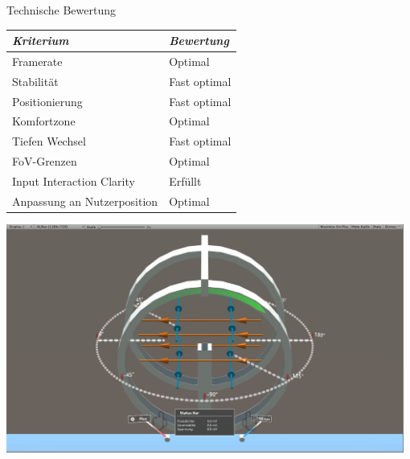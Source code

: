 \begin{frame}[fragile]{Technische Bewertung}
\begin{minipage}{0.62\textwidth}
\bgroup
\setlength\extrarowheight{1pt}
\def\arraystretch{1.1}
\begin{table}
	\centering
	\begin{tabular}{m{4.1cm}|l}
		\textit{Kriterium} & \textit{Bewertung}\\
		\hline
		Framerate & Optimal\\
		\hline
		Stabilität & Fast optimal\\
		\hline
		Positionierung & Fast optimal\\
		\hline
		Komfortzone & Optimal\\
		\hline
		Tiefen Wechsel & Fast optimal\\
		\hline
		FoV-Grenzen & Optimal\\
		\hline
		Input Interaction Clarity & Erfüllt\\
		\hline
		Anpassung an Nutzerposition & Optimal\\
	\end{tabular}
\end{table}
\setlength\extrarowheight{0pt}
\def\arraystretch{1}
\egroup
\end{minipage}
\begin{minipage}{0.35\textwidth}
	\includegraphics[width=0.98\textwidth]{images/unity/fov.JPG}\\
	

\end{minipage}
\end{frame}
